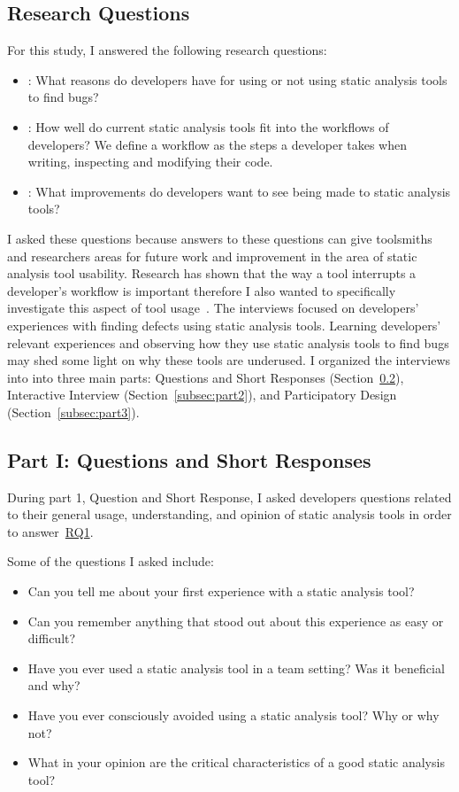 \subsection{Research Questions}
\label{subsec:rq}
For this study, I answered the following research questions:
\begin{itemize}
\item [RQ\textsubscript{1}]: What reasons do developers have for using
or not using static analysis tools to find bugs?
\item [RQ\textsubscript{2}]: How well do current static analysis tools
fit into the workflows of developers? We define a workflow as the steps a
developer takes when writing, inspecting and modifying their code.
\item [RQ\textsubscript{3}]: What improvements do developers want
to see being made to static analysis tools?
\end{itemize}

I asked these questions because answers to these questions can give toolsmiths
and researchers areas for future work and improvement in the area of static
analysis tool usability. Research has shown that the way a tool interrupts a developer's
workflow is important therefore I also wanted to specifically investigate this
aspect of tool usage~\cite{Robertson:2004:Interruption, Gluck:2007:Attentional}.
The interviews focused on developers' experiences with finding defects using
static analysis tools. Learning developers' relevant experiences and observing
how they use static analysis tools to find bugs may shed some light on why these
tools are underused. I organized the interviews into into three main
parts: Questions and Short Responses (Section~\ref{subsec:part1}), Interactive
Interview (Section~\ref{subsec:part2}), and Participatory Design
(Section~\ref{subsec:part3}).


\subsection{Part I: Questions and Short Responses}
\label{subsec:part1}
During part 1, Question and Short Response, I asked developers questions
related to their general usage, understanding, and opinion of static analysis
tools in order to answer~\hyperlink{RQ1}{RQ1}.

Some of the questions I asked include:
\begin{itemize}
\item Can you tell me about your first experience with a static analysis tool?
\item Can you remember anything that stood out about this experience as easy or difficult?
\item Have you ever used a static analysis tool in a team setting? Was it beneficial and why?
\item Have you ever consciously avoided using a static analysis tool? Why or why not?
\item What in your opinion are the critical characteristics of a good static analysis tool?
\end{itemize}

